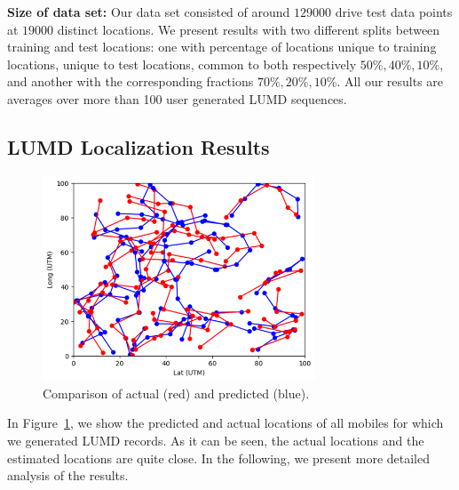 \documentclass[conference, 10pt]{IEEEtran}
\begin{document}
{\bf Size of data set:} Our data set consisted of around $129000$ drive test data
points at $19000$ distinct locations. We present results with two different splits
between training and test locations: one with percentage of locations unique to
training locations, unique to test locations, common to both respectively  $50\%,
40\%, 10\%$, and another with the corresponding fractions $70\%,20\%,10\%$. All our
results are averages over more than 100 user generated LUMD sequences.

\subsection{LUMD Localization Results}


\begin{figure}[t]
\begin{center}
\includegraphics[height=2.4in,width=3.2in]{./Combined_path_illustration.png}
\caption{\label{fig:toyeg}
{\small Comparison of actual (red) and predicted (blue).}}
\end{center}
\end{figure}


In Figure~\ref{fig:toyeg}, we show the predicted and actual locations of all mobiles
for which we generated LUMD records. As it can be seen, the actual locations
and the estimated locations are quite close. In the following, we present more
detailed analysis of the results.
\end{document}
